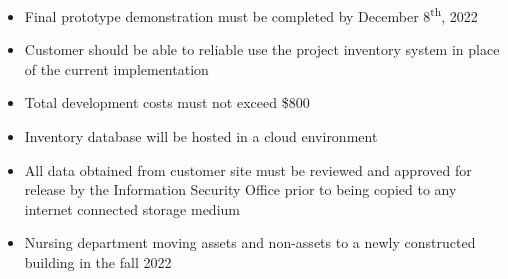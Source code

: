 



\begin{itemize}
  \item Final prototype demonstration must be completed by December 8\textsuperscript{th}, 2022
  \item Customer should be able to reliable use the project inventory system in place of the current implementation
  \item Total development costs must not exceed \$800
  \item Inventory database will be hosted in a cloud environment
  \item All data obtained from customer site must be reviewed and approved for release by the Information Security Office prior to being copied to any internet connected storage medium
  \item Nursing department moving assets and non-assets to a newly constructed building in the fall 2022
\end{itemize}

